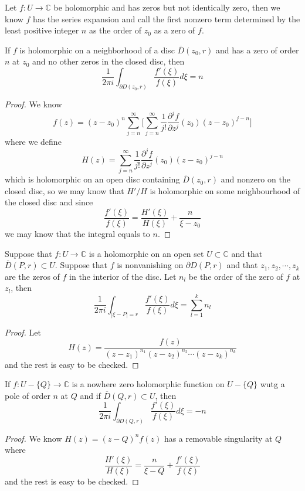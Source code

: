 \documentclass[lang=en, color=blue, ]{elegantbook}
\newcommand{\C}{\mathbb{C}}
\begin{document}
\begin{definition}
    Let $f:U\to\C$ be holomorphic and has zeros but not identically zero, then we know $f$ has the series expansion and call the first nonzero term determined by the least positive integer $n$ as the order of $z_0$ as a zero of $f$.
\end{definition}

\begin{lemma}
    If $f$ is holomorphic on a neighborhood of a disc $\overline{D}(z_0,r)$ and has a zero of order $n$ at $z_0$ and no other zeros in the closed disc, then
    \[\dfrac{1}{2\pi i}\int_{\partial D(z_0,r)}\dfrac{f'(\xi)}{f(\xi)}d\xi = n\]
\end{lemma}
\begin{proof}
    We know
    \[f(z) = (z-z_0)^n\sum\limits_{j=n}^{\infty}\Big[\sum\limits_{j=n}^{\infty}\dfrac{1}{j!}\dfrac{\partial^j f}{\partial z^j}(z_0)(z-z_0)^{j-n}\Big]\]
    where we define 
    \[H(z) = \sum\limits_{j=n}^{\infty}\dfrac{1}{j!}\dfrac{\partial^j f}{\partial z^j}(z_0)(z-z_0)^{j-n}\]
    which is holomorphic on an open disc containing $\overline{D}(z_0,r)$ and nonzero on the closed disc, so we may know that $H'/H$ is holomorphic on some neighbourhood of the closed disc and since
    \[
    \dfrac{f'(\xi)}{f(\xi)} = \dfrac{H'(\xi)}{H(\xi)} + \dfrac{n}{\xi - z_0}
    \]
    we may know that the integral equals to $n$.
\end{proof}

\begin{proposition}
    Suppose that $f:U\to\C$ is a holomorphic on an open set $U\subset\C$ and that $\overline{D}(P,r)\subset U$. Suppose that $f$ is nonvanishing on $\partial D(P,r)$ and that $z_1,z_2,\cdots,z_k$ are the zeros of $f$ in the interior of the disc. Let $n_l$ be the order of the zero of $f$ at $z_l$, then
    \[\dfrac{1}{2\pi i}\int_{|\xi-P| = r}\dfrac{f'(\xi)}{f(\xi)}d\xi = \sum\limits_{l=1}^k n_l\]
\end{proposition}
\begin{proof}
    Let
    \[H(z) = \dfrac{f(z)}{(z-z_1)^{n_1}(z-z_2)^{n_2}\cdots(z-z_k)^{n_k}}\]
    and the rest is easy to be checked.
\end{proof}

\begin{lemma}
    If $f:U-\{Q\} \to \C$ is a nowhere zero holomorphic function on $U-\{Q\}$ wutg a pole of order $n$ at $Q$ and if $\overline{D}(Q,r)\subset U$, then
    \[\dfrac{1}{2\pi i}\int_{\partial D(Q,r)}\dfrac{f'(\xi)}{f(\xi)} d\xi = -n\]
\end{lemma}
\begin{proof}
    We know $H(z) = (z-Q)^nf(z)$ has a removable singularity at $Q$ where
    \[\dfrac{H'(\xi)}{H(\xi)} = \dfrac{n}{\xi-Q}+\dfrac{f'(\xi)}{f(\xi)}\]
    and the rest is easy to be checked.
\end{proof}
\end{document}
